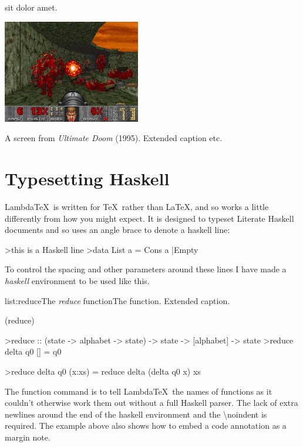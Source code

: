  sit dolor amet.
\lipsum[2-3]

\begin{marginfigure}
	\includegraphics[width=6cm]{res/game_screens/doom/doom.png}
	\caption[A screen from \emph{Ultimate Doom}.]{A screen from \emph{Ultimate Doom} (1995). Extended caption etc.}
	\label{fig:doom}
\end{marginfigure}

\lipsum[4]

\section{Typesetting Haskell}

Lambda\TeX\ is written for \TeX\ rather than \LaTeX, and so works a little differently from how you might expect. It is designed to typeset Literate Haskell documents and so uses an angle brace to denote a haskell line:

>this is a Haskell line
>data List a = Cons a |Empty

To control the spacing and other parameters around these lines I have made a \emph{haskell} environment to be used like this.

\vspace{-0.5em}
\begin{listing}{list:reduce}{The \emph{reduce} function}{The  function. Extended caption.}{}
\end{listing}\vspace{-1.5em}

\functions(reduce)
\begin{haskell}
>reduce :: (state -> alphabet -> state) -> state -> [alphabet] -> state
>reduce delta q0 []     = q0

\vspace{-1.7em}
>reduce delta q0 (x:xs) = reduce delta (delta q0 x) xs

\end{haskell}
\noindent
The function command is to tell Lambda\TeX\ the names of functions as it couldn't otherwise work them out without a full Haskell parser. The lack of extra newlines around the end of the haskell environment and the \textbackslash noindent is required. The example above also shows how to embed a code annotation as a margin note. 

